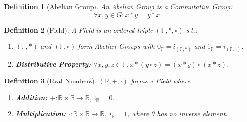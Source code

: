 \documentclass{article}
\newtheorem{definition}{Definition}[section]
\begin{document}
			\begin{definition}[Abelian Group]
			\label{abelian group}
				An Abelian Group is a Commutative Group: \\
				$$\forall x, y \in G: x * y = y * x$$
			\end{definition}

			\begin{definition}[Field]
			\label{field}
				A Field is an ordered triple $(\mathbb{F}, *, \circ)$ s.t.:
				\begin{enumerate}
					\item $(\mathbb{F}, *)$ and $(\mathbb{F}, \circ)$ form Abelian Groups with $0_\mathbb{F} = i_{(\mathbb{F}, *)}$ and $1_\mathbb{F} = i_{(\mathbb{F}, \circ)}$.
					\item \textbf{Distributive Property:} $\forall x, y, z \in \mathbb{F}, x * (y \circ z) = (x * y) \circ (x * z)$.
				\end{enumerate}
			\end{definition}
			
			\begin{definition}[Real Numbers]
			\label{real numbers}
				$(\mathbb{R}, +, \cdot)$ forms a Field where:
				\begin{enumerate}
					\item \textbf{Addition:} $+\colon \mathbb{R} \times \mathbb{R} \to \mathbb{R}$, $i_\mathbb{R} = 0$. 
					\item \textbf{Multiplication:} $\cdot \colon \mathbb{R} \times \mathbb{R} \to \mathbb{R}$, $i_\mathbb{R} = 1$, where 0 has no inverse element.
				\end{enumerate}
			\end{definition}
\end{document}
